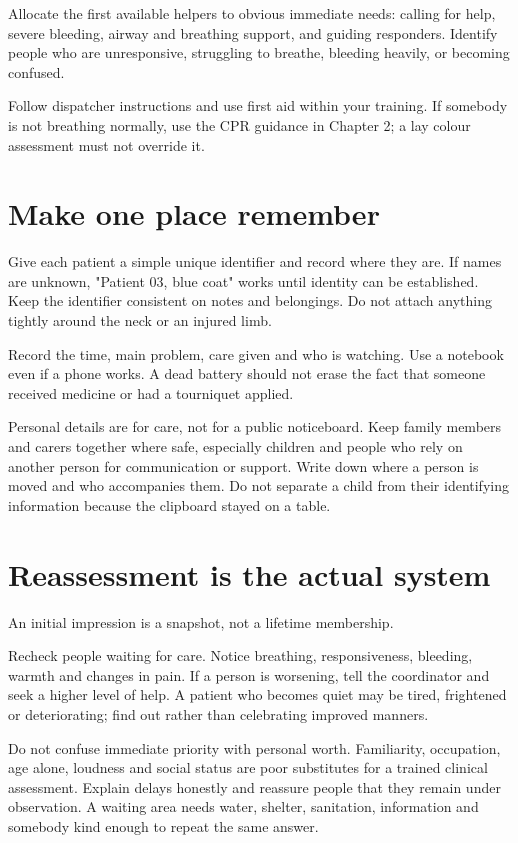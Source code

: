 \documentclass[10pt,openright]{book}
\begin{document}
Allocate the first available helpers to obvious immediate needs: calling for help, severe bleeding, airway and breathing support, and guiding responders. Identify people who are unresponsive, struggling to breathe, bleeding heavily, or becoming confused.

Follow dispatcher instructions and use first aid within your training. If somebody is not breathing normally, use the CPR guidance in Chapter 2; a lay colour assessment must not override it.

\section*{Make one place remember}
Give each patient a simple unique identifier and record where they are. If names are unknown, "Patient 03, blue coat" works until identity can be established. Keep the identifier consistent on notes and belongings. Do not attach anything tightly around the neck or an injured limb.

Record the time, main problem, care given and who is watching. Use a notebook even if a phone works. A dead battery should not erase the fact that someone received medicine or had a tourniquet applied.

Personal details are for care, not for a public noticeboard. Keep family members and carers together where safe, especially children and people who rely on another person for communication or support. Write down where a person is moved and who accompanies them. Do not separate a child from their identifying information because the clipboard stayed on a table.

\section*{Reassessment is the actual system}
An initial impression is a snapshot, not a lifetime membership.

Recheck people waiting for care. Notice breathing, responsiveness, bleeding, warmth and changes in pain. If a person is worsening, tell the coordinator and seek a higher level of help. A patient who becomes quiet may be tired, frightened or deteriorating; find out rather than celebrating improved manners.

Do not confuse immediate priority with personal worth. Familiarity, occupation, age alone, loudness and social status are poor substitutes for a trained clinical assessment. Explain delays honestly and reassure people that they remain under observation. A waiting area needs water, shelter, sanitation, information and somebody kind enough to repeat the same answer.
\end{document}

